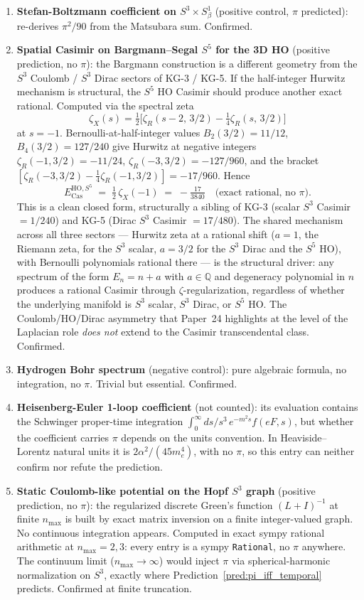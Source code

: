 \documentclass[11pt]{article}
\begin{document}
\begin{enumerate}
\setlength\itemsep{0pt}
\item \textbf{Stefan-Boltzmann coefficient on $S^3 \times S^1_\beta$}
(positive control, $\pi$ predicted): re-derives $\pi^2/90$ from the
Matsubara sum.  Confirmed.
\item \textbf{Spatial Casimir on Bargmann--Segal $S^5$ for the 3D HO}
(positive prediction, no $\pi$): the Bargmann construction is a
different geometry from the $S^3$ Coulomb / $S^3$ Dirac sectors of
KG-3 / KG-5.  If the half-integer Hurwitz mechanism is structural, the
$S^5$ HO Casimir should produce another exact rational.  Computed via
the spectral zeta
\[
\zeta_X(s) = \tfrac{1}{2}\bigl[\zeta_R(s{-}2,\, 3/2) -
\tfrac{1}{4}\zeta_R(s,\, 3/2)\bigr]
\]
at $s = -1$.  Bernoulli-at-half-integer values $B_2(3/2) = 11/12$,
$B_4(3/2) = 127/240$ give Hurwitz at negative integers
$\zeta_R(-1, 3/2) = -11/24$, $\zeta_R(-3, 3/2) = -127/960$, and the
bracket $[\zeta_R(-3, 3/2) - \tfrac{1}{4}\zeta_R(-1, 3/2)] = -17/960$.
Hence
\[
  E_\text{Cas}^{\text{HO}, S^5}
  \;=\; \tfrac{1}{2}\,\zeta_X(-1)
  \;=\; -\tfrac{17}{3840}
  \quad \text{(exact rational, no $\pi$).}
\]
This is a clean closed form, structurally a sibling of KG-3
(scalar $S^3$ Casimir $= 1/240$) and KG-5 (Dirac $S^3$ Casimir
$= 17/480$).  The shared mechanism across all three sectors ---
Hurwitz zeta at a rational shift ($a = 1$, the Riemann zeta, for the $S^3$ scalar,
$a = 3/2$ for the $S^3$ Dirac and the $S^5$ HO), with Bernoulli
polynomials rational there --- is the structural driver: any spectrum
of the form $E_n = n + a$ with $a \in \mathbb{Q}$ and degeneracy
polynomial in $n$ produces a rational Casimir through
$\zeta$-regularization, regardless of whether the underlying manifold
is $S^3$ scalar, $S^3$ Dirac, or $S^5$ HO.  The Coulomb/HO/Dirac
asymmetry that Paper~24 highlights at the level of the Laplacian role
\emph{does not} extend to the Casimir transcendental class.
Confirmed.
\item \textbf{Hydrogen Bohr spectrum} (negative control): pure
algebraic formula, no integration, no $\pi$.  Trivial but essential.
Confirmed.
\item \textbf{Heisenberg-Euler 1-loop coefficient} (not counted):
its evaluation contains the Schwinger proper-time integration
$\int_0^\infty ds/s^3 \, e^{-m^2 s} f(eF, s)$, but whether the
coefficient carries $\pi$ depends on the units convention.  In
Heaviside--Lorentz natural units it is $2\alpha^2/(45 m_e^4)$, with no
$\pi$, so this entry can neither confirm nor refute the prediction.
\item \textbf{Static Coulomb-like potential on the Hopf $S^3$ graph}
(positive prediction, no $\pi$): the regularized discrete Green's
function $(L + I)^{-1}$ at finite $n_\text{max}$ is built by exact
matrix inversion on a finite integer-valued graph.  No continuous
integration appears.  Computed in exact sympy rational arithmetic at
$n_\text{max} = 2, 3$: every entry is a sympy \texttt{Rational}, no
$\pi$ anywhere.  The continuum limit ($n_\text{max} \to \infty$) would
inject $\pi$ via spherical-harmonic normalization on $S^3$, exactly
where Prediction~\ref{pred:pi_iff_temporal} predicts.  Confirmed at
finite truncation.
\end{enumerate}
\end{document}
